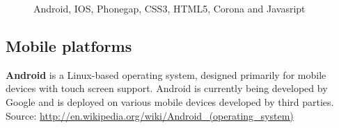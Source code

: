 \begin{figure}[!ht]
{}
\caption{Android, IOS, Phonegap, CSS3, HTML5, Corona and Javasript}
\end{figure}

\subsection{Mobile platforms}
{\bf Android} is a Linux-based operating system, designed primarily for mobile
devices with touch screen support. Android is currently being developed by
Google and is deployed on various mobile devices developed by third parties.
Source: \url{http://en.wikipedia.org/wiki/Android_(operating_system)}
\linebreak

